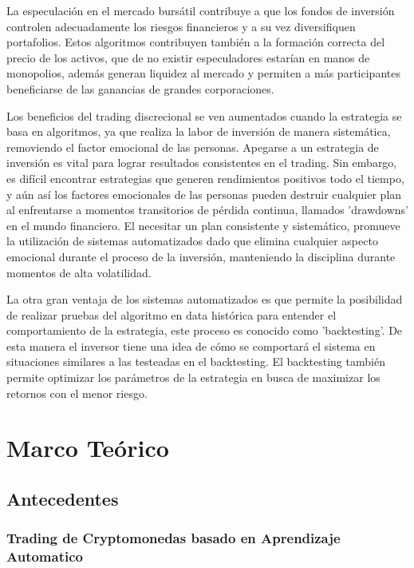 \documentclass[a4paper,12pt]{Latex/Classes/PhDthesisPSnPDF}
\begin{document}
La especulación en el mercado bursátil contribuye a que los fondos de inversión controlen adecuadamente los riesgos financieros y a su vez diversifiquen portafolios. Estos algoritmos contribuyen también a la formación correcta del precio de los activos, que de no existir especuladores estarían en manos de monopolios, además generan liquidez al mercado y permiten a más participantes beneficiarse de las ganancias de grandes corporaciones.

Los beneficios del trading discrecional se ven aumentados cuando la estrategia se basa en algoritmos, ya que realiza la labor de inversión de manera sistemática, removiendo el factor emocional de las personas. Apegarse a un estrategia de inversión es vital para lograr resultados consistentes en el trading. Sin embargo, es difícil encontrar estrategias que generen rendimientos positivos todo el tiempo, y aún así los factores emocionales de las personas pueden destruir cualquier plan al enfrentarse a momentos transitorios de pérdida continua, llamados 'drawdowns' en el mundo financiero. El necesitar un plan consistente y sistemático, promueve la utilización de sistemas automatizados dado que elimina cualquier aspecto emocional durante el proceso de la inversión, manteniendo la disciplina durante momentos de alta volatilidad.

La otra gran ventaja de los sistemas automatizados es que permite la posibilidad de realizar pruebas del algoritmo en data histórica para entender el comportamiento de la estrategia, este proceso es conocido como 'backtesting'. De esta manera el inversor tiene una idea de cómo se comportará el sistema en situaciones similares a las testeadas en el backtesting. El backtesting también permite optimizar los parámetros de la estrategia en busca de maximizar los retornos con el menor riesgo. 

\chapter{Marco Teórico}

\section{Antecedentes}

\subsection{Trading de Cryptomonedas basado en Aprendizaje Automatico}
\end{document}
